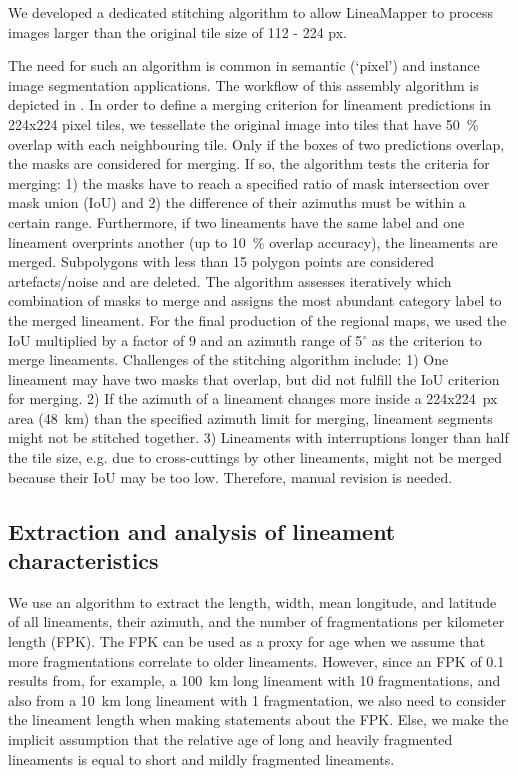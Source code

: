 We developed a dedicated stitching algorithm to allow LineaMapper to process images larger than the original tile size of 112 - 224 px.

The need for such an algorithm is common in semantic (`pixel') and instance image segmentation applications.  %
The workflow of this assembly algorithm is depicted in . In order to define a merging criterion for lineament predictions in 224x224 pixel tiles, we tessellate the original image into tiles that have 50~\% overlap with each neighbouring tile. 
Only if the boxes of two predictions overlap, the masks are considered for merging. If so, the algorithm tests the criteria for merging: 1) the masks have to reach a specified ratio of mask intersection over mask union (IoU) and 2) the difference of their azimuths must be within a certain range. Furthermore, if two lineaments have the same label and one lineament overprints another (up to 10~\% overlap accuracy), the lineaments are merged. Subpolygons with less than 15 polygon points are considered artefacts/noise and are deleted. The algorithm assesses iteratively which combination of masks to merge and assigns the most abundant category label to the merged lineament. For the final production of the regional maps, we used the IoU multiplied by a factor of 9 and an azimuth range of 5$^{\circ}$ as the criterion to merge lineaments.
Challenges of the stitching algorithm include: 1) One lineament may have two masks that overlap, but did not fulfill the IoU criterion for merging. 2) If the azimuth of a lineament changes more inside a 224x224~px area (48~km) than the specified azimuth limit for merging, lineament segments might not be stitched together. 3) Lineaments with interruptions longer than half the tile size, e.g. due to cross-cuttings by other lineaments, might not be merged because their IoU may be too low. Therefore, manual revision is needed. 

\subsection{Extraction and analysis of lineament characteristics}\label{Sect_extraction_algo}
We use an algorithm to extract the length, width, mean longitude, and latitude of all lineaments, their azimuth, and the number of fragmentations per kilometer length (FPK). The FPK can be used as a proxy for age when we assume that more fragmentations correlate to older lineaments. However, since an FPK of 0.1 results from, for example, a 100~km long lineament with 10 fragmentations, and also from a 10~km long lineament with 1 fragmentation, we also need to consider the lineament length when making statements about the FPK. Else, we make the implicit assumption that the relative age of long and heavily fragmented lineaments is equal to short and mildly fragmented lineaments.

